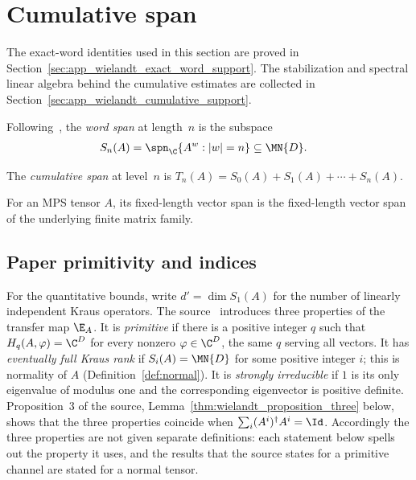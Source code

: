 \section{Cumulative span}

The exact-word identities used in this section are proved in
Section~\ref{sec:app_wielandt_exact_word_support}. The stabilization and
spectral linear algebra behind the cumulative estimates are collected in
Section~\ref{sec:app_wielandt_cumulative_support}.


\begin{definition}\label{def:word_span}
    \leanok
    Following~\cite[Section~II]{Sanz2010Quantum}, the \emph{word span} at
    length~$n$ is the subspace
    \begin{align}
        S_n(A)
         & =\spn_{\C}\{A^w:|w|=n\}\subseteq\MN{D}.
        \notag
    \end{align}
\end{definition}

\begin{definition}\label{def:cumulative_span}
    \leanok
    The \emph{cumulative span} at level~$n$ is
    $T_n(A)=S_0(A)+S_1(A)+\cdots+S_n(A)$.
\end{definition}


\begin{definition}
    \label{def:mps_vector_spread_span}
    \leanok

    For an MPS tensor $A$, its fixed-length vector span is the fixed-length
    vector span of the underlying finite matrix family.
\end{definition}

\subsection{Paper primitivity and indices}

For the quantitative bounds, write $d'=\dim S_1(A)$ for the number of
linearly independent Kraus operators. The source~\cite{Sanz2010Quantum}
introduces three properties of the transfer map $\E_A$. It is
\emph{primitive} if there is a positive integer $q$ such that
$H_q(A,\varphi)=\C^D$ for every nonzero $\varphi\in\C^D$, the same $q$
serving all vectors. It has \emph{eventually full Kraus rank} if
$S_i(A)=\MN{D}$ for some positive integer $i$; this is normality of $A$
(Definition~\ref{def:normal}). It is \emph{strongly irreducible} if $1$ is its
only eigenvalue of modulus one and the corresponding eigenvector is positive
definite. Proposition~3 of the source, Lemma~\ref{thm:wielandt_proposition_three}
below, shows that the three properties coincide when
$\sum_i(A^i)^\dagger A^i=\Id$. Accordingly the three properties are not given
separate definitions: each statement below spells out the property it uses, and
the results that the source states for a primitive channel are stated for a
normal tensor.

